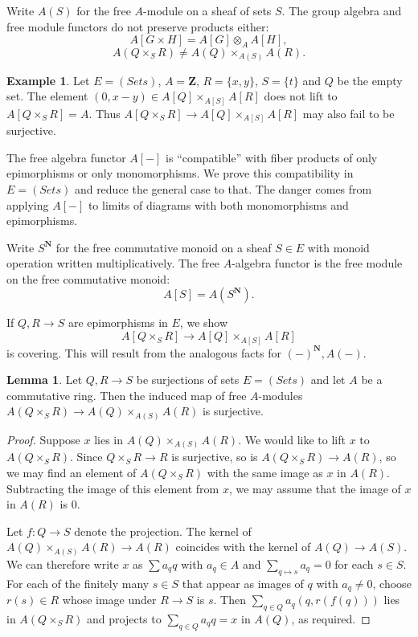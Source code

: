 \documentclass[11pt,reqno]{amsart}
\theoremstyle{definition}
\newtheorem{lemma}[theorem]{Lemma}
\newtheorem{example}[theorem]{Example}
\newcommand{\ZZ}{\mathbf{Z}}
\newcommand{\NN}{{\mathbf{N}}}
\begin{document}
Write $A(S)$ for the free $A$-module on a sheaf of sets $S$. The group algebra and free module functors do not preserve products either: 
\[A[G \times H] = A[G] \otimes_A A[H],\]
\[A(Q \times_S R) \neq A(Q) \times_{A(S)} A(R).\]



\begin{example}

	Let $E = (Sets)$, $A = \ZZ$, $R = \{x, y\}$, $S = \{t\}$ and $Q$ be the empty set. The element $(0, x-y) \in A[Q] \times_{A[S]} A[R]$ does not lift to $A[Q \times_S R] = A$.  Thus $A[Q \mathop\times_S R] \to A[Q] \mathop\times_{A[S]} A[R]$ may also fail to be surjective.

\end{example}


The free algebra functor $A[-]$ is ``compatible'' with fiber products of only epimorphisms or only monomorphisms. We prove this compatibility in $E = (Sets)$ and reduce the general case to that. The danger comes from applying $A[-]$ to limits of diagrams with both monomorphisms and epimorphisms. 



Write $S^\NN$ for the free commutative monoid on a sheaf $S \in E$ with monoid operation written multiplicatively. The free $A$-algebra functor is the free module on the free commutative monoid: 
\[A[S] = A(S^\NN).\]

If $Q, R \to S$ are epimorphisms in $E$, we show
\[A[Q \times_S R] \to A[Q] \times_{A[S]} A[R]\]
is covering. This will result from the analogous facts for $(-)^\NN, A(-)$. 


\begin{lemma} \label{lem:module-case}
	Let $Q, R \to S$ be surjections of sets $E = (Sets)$ and let $A$ be a commutative ring.  Then the induced map of free $A$-modules $A(Q \mathop\times_S R) \to A(Q) \mathop\times_{A(S)} A(R)$ is surjective.
\end{lemma}
\begin{proof}
Suppose $x$ lies in $A(Q) \mathop\times_{A(S)} A(R)$.  We would like to lift $x$ to $A(Q\mathop\times_S R)$.  Since $Q \mathop\times_S R \to R$ is surjective, so is $A(Q\mathop\times_S R) \to A(R)$, so we may find an element of $A(Q\mathop\times_S R)$ with the same image as $x$ in $A(R)$.  Subtracting the image of this element from $x$, we may assume that the image of $x$ in $A(R)$ is $0$.

Let $f : Q \to S$ denote the projection.  The kernel of $A(Q) \mathop\times_{A(S)} A(R) \to A(R)$ coincides with the kernel of $A(Q) \to A(S)$.  We can therefore write $x$ as $\sum a_q q$ with $a_q \in A$ and $\sum_{q \mapsto s} a_q = 0$ for each $s \in S$.  For each of the finitely many $s \in S$ that appear as images of $q$ with $a_q \neq 0$, choose $r(s) \in R$ whose image under $R \to S$ is $s$.  Then $\sum_{q \in Q} a_q (q, r(f(q)))$ lies in $A(Q \mathop\times_S R)$ and projects to $\sum_{q \in Q} a_q q = x$ in $A(Q)$, as required.
\end{proof}
\end{document}
